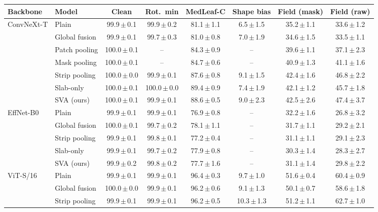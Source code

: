 \begin{tabular}{llcccccc}
\toprule
Backbone & Model & Clean & Rot.\ min & MedLeaf-C & Shape bias & Field (mask) & Field (raw) \\
\midrule
ConvNeXt-T & Plain & 99.9\,$\pm$\,0.1 & 99.9\,$\pm$\,0.2 & 81.1\,$\pm$\,1.1 & 6.5\,$\pm$\,1.5 & 35.2\,$\pm$\,1.1 & 33.6\,$\pm$\,1.2 \\
 & Global fusion & 99.9\,$\pm$\,0.1 & 99.7\,$\pm$\,0.3 & 81.0\,$\pm$\,0.8 & 7.0\,$\pm$\,1.9 & 34.6\,$\pm$\,1.5 & 33.5\,$\pm$\,1.1 \\
 & Patch pooling & 100.0\,$\pm$\,0.1 & -- & 84.3\,$\pm$\,0.9 & -- & 39.6\,$\pm$\,1.1 & 37.1\,$\pm$\,2.3 \\
 & Mask pooling & 100.0\,$\pm$\,0.1 & -- & 84.7\,$\pm$\,0.6 & -- & 40.9\,$\pm$\,1.3 & 41.1\,$\pm$\,1.6 \\
 & Strip pooling & 100.0\,$\pm$\,0.0 & 99.9\,$\pm$\,0.1 & 87.6\,$\pm$\,0.8 & 9.1\,$\pm$\,1.5 & 42.4\,$\pm$\,1.6 & 46.8\,$\pm$\,2.2 \\
 & Slab-only & 100.0\,$\pm$\,0.1 & 100.0\,$\pm$\,0.0 & 89.4\,$\pm$\,0.9 & 7.4\,$\pm$\,1.9 & 42.1\,$\pm$\,1.2 & 45.7\,$\pm$\,1.8 \\
 & SVA (ours) & 100.0\,$\pm$\,0.1 & 99.9\,$\pm$\,0.1 & 88.6\,$\pm$\,0.5 & 9.0\,$\pm$\,2.3 & 42.5\,$\pm$\,2.6 & 47.4\,$\pm$\,3.7 \\
\midrule
EffNet-B0 & Plain & 99.9\,$\pm$\,0.1 & 99.9\,$\pm$\,0.1 & 76.9\,$\pm$\,0.8 & -- & 32.2\,$\pm$\,1.6 & 26.8\,$\pm$\,3.2 \\
 & Global fusion & 100.0\,$\pm$\,0.1 & 99.7\,$\pm$\,0.2 & 78.1\,$\pm$\,1.1 & -- & 31.7\,$\pm$\,1.1 & 29.2\,$\pm$\,2.1 \\
 & Strip pooling & 99.9\,$\pm$\,0.1 & 99.8\,$\pm$\,0.1 & 77.2\,$\pm$\,0.4 & -- & 31.1\,$\pm$\,1.1 & 29.1\,$\pm$\,2.3 \\
 & Slab-only & 99.9\,$\pm$\,0.1 & 99.7\,$\pm$\,0.2 & 77.9\,$\pm$\,0.8 & -- & 30.3\,$\pm$\,1.4 & 28.3\,$\pm$\,2.7 \\
 & SVA (ours) & 99.9\,$\pm$\,0.2 & 99.8\,$\pm$\,0.2 & 77.7\,$\pm$\,1.6 & -- & 31.1\,$\pm$\,1.4 & 29.8\,$\pm$\,2.2 \\
\midrule
ViT-S/16 & Plain & 99.9\,$\pm$\,0.1 & 99.9\,$\pm$\,0.1 & 96.4\,$\pm$\,0.3 & 9.7\,$\pm$\,1.0 & 51.6\,$\pm$\,0.4 & 60.4\,$\pm$\,0.9 \\
 & Global fusion & 100.0\,$\pm$\,0.0 & 99.9\,$\pm$\,0.1 & 96.2\,$\pm$\,0.6 & 9.1\,$\pm$\,1.3 & 50.1\,$\pm$\,0.7 & 58.6\,$\pm$\,1.8 \\
 & Strip pooling & 99.9\,$\pm$\,0.1 & 99.9\,$\pm$\,0.1 & 96.2\,$\pm$\,0.5 & 10.3\,$\pm$\,1.3 & 51.2\,$\pm$\,1.1 & 62.7\,$\pm$\,1.0 \\

\end{tabular}
